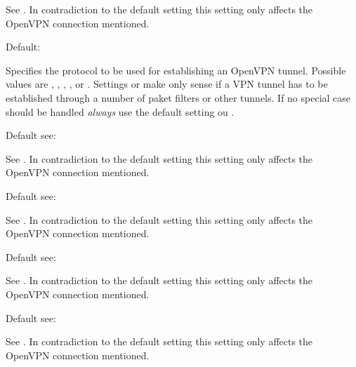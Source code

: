 \begin{description}
  See . In
  contradiction to the default setting this setting only affects the OpenVPN 
  connection mentioned.


  Default: 

  Specifies the protocol to be used for establishing an OpenVPN tunnel. 
  Possible values are , , , 
  ,  or .
  Settings  or  make only sense 
  if a VPN tunnel has to be established through a number of paket filters 
  or other tunnels. If no special case should be handled \emph{always} 
  use the default setting  ou .
  

  Default see: 

  See
  .
   In contradiction to the default setting this setting only affects the OpenVPN 
  connection mentioned.


  Default see: 

  See
  .
  In contradiction to the default setting this setting only affects the OpenVPN 
  connection mentioned.
  

  Default see: 

  See . 
  In contradiction to the default setting this setting only affects the OpenVPN 
  connection mentioned.


  Default see: 

  See . 
  In contradiction to the default setting this setting only affects the OpenVPN 
  connection mentioned.


\end{description}
